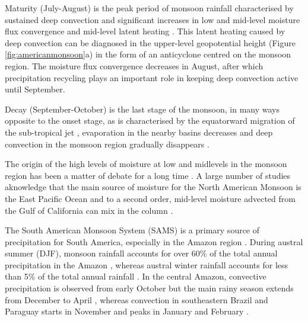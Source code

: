 Maturity (July-August) is the peak period of monsoon rainfall characterised by sustained deep convection \citep{barlow1998} and significant increases in low and mid-level moisture flux convergence and mid-level latent heating \citep{adams1997,cook2013}. This latent heating caused by deep convection can be diagnosed in the upper-level geopotential height (Figure \ref{fig:americanmonsoon}a) in the form of an anticyclone centred on the monsoon region. 
The moisture flux convergence decreases in August, after which precipitation recycling \citep{dominguez2008} plays an important role in keeping deep convection active until September.


 Decay (September-October) is the last stage of the monsoon, in many ways opposite to the onset stage, as is characterised by the equatorward migration of the sub-tropical jet \citep{higgins1997,geil2013}, evaporation in the nearby basins decreases and deep convection in the monsoon region gradually disappears \citep{douglas1993}.

 The origin of the high levels of moisture at low and midlevels in the monsoon region has been a matter of debate for a long time \citep{adams1997,barlow1998,vera2006,ordonez2019}.
A large number of studies aknowledge that the main source of moisture for the North American Monsoon is the East Pacific Ocean and to a second order, mid-level moisture advected from the Gulf of California can mix in the column \citep[e.g.][]{adams1997,stensrud1997,vera2006,turrent2009,ordonez2019}.


The South American Monsoon System (SAMS) is a primary source of precipitation for South America, especially in the Amazon region \citep{gan2004,vera2006,jones2013}.
During austral summer (DJF), monsoon rainfall accounts for over 60\% of the total annual precipitation in the Amazon \citep{gan2004,marengo2012}, whereas
austral winter rainfall accounts for less than 5\% of the total annual rainfall \citep{vera2006}.
In the central Amazon, convective precipitation is observed from early October but the main rainy season extends from December to April \citep{machado2004,adams2013}, whereas convection in southeastern Brazil and Paraguay starts in November and peaks in January and February \citep{marengo2001,nieto2011}. 

